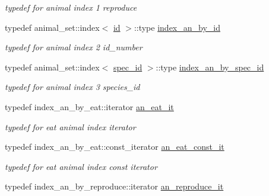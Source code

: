 \begin{DoxyCompactItemize}
\begin{DoxyCompactList}\small\item\em typedef for animal index 1 reproduce \end{DoxyCompactList}\item 
\hypertarget{classSubsystemContainer_ae095d19ad8aee4e1f1620166f440cf99}{
typedef animal\_\-set::index$<$ \hyperlink{structSubsystemContainer_1_1id}{id} $>$::type \hyperlink{classSubsystemContainer_ae095d19ad8aee4e1f1620166f440cf99}{index\_\-an\_\-by\_\-id}}
\label{classSubsystemContainer_ae095d19ad8aee4e1f1620166f440cf99}

\begin{DoxyCompactList}\small\item\em typedef for animal index 2 id\_\-number \end{DoxyCompactList}\item 
\hypertarget{classSubsystemContainer_a14b34b168bd55dd0b39a69795a65f4f8}{
typedef animal\_\-set::index$<$ \hyperlink{structSubsystemContainer_1_1spec__id}{spec\_\-id} $>$::type \hyperlink{classSubsystemContainer_a14b34b168bd55dd0b39a69795a65f4f8}{index\_\-an\_\-by\_\-spec\_\-id}}
\label{classSubsystemContainer_a14b34b168bd55dd0b39a69795a65f4f8}

\begin{DoxyCompactList}\small\item\em typedef for animal index 3 species\_\-id \end{DoxyCompactList}\item 
\hypertarget{classSubsystemContainer_a90723cf9f8cdae39e46ff65c5c898c2c}{
typedef index\_\-an\_\-by\_\-eat::iterator \hyperlink{classSubsystemContainer_a90723cf9f8cdae39e46ff65c5c898c2c}{an\_\-eat\_\-it}}
\label{classSubsystemContainer_a90723cf9f8cdae39e46ff65c5c898c2c}

\begin{DoxyCompactList}\small\item\em typedef for eat animal index iterator \end{DoxyCompactList}\item 
\hypertarget{classSubsystemContainer_a8ca51192ff066562729da7972e1c6d2e}{
typedef index\_\-an\_\-by\_\-eat::const\_\-iterator \hyperlink{classSubsystemContainer_a8ca51192ff066562729da7972e1c6d2e}{an\_\-eat\_\-const\_\-it}}
\label{classSubsystemContainer_a8ca51192ff066562729da7972e1c6d2e}

\begin{DoxyCompactList}\small\item\em typedef for eat animal index const iterator \end{DoxyCompactList}\item 
\hypertarget{classSubsystemContainer_aee4873426aef4e4f9f8d41ffb2b2f781}{
typedef index\_\-an\_\-by\_\-reproduce::iterator \hyperlink{classSubsystemContainer_aee4873426aef4e4f9f8d41ffb2b2f781}{an\_\-reproduce\_\-it}}
\label{classSubsystemContainer_aee4873426aef4e4f9f8d41ffb2b2f781}


\end{DoxyCompactItemize}

